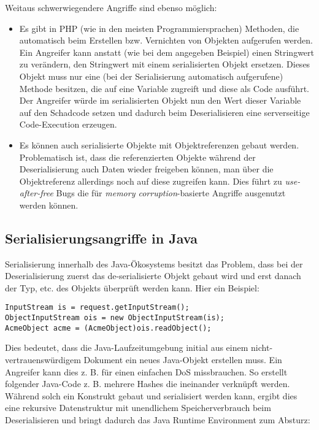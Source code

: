 Weitaus schwerwiegendere Angriffe sind ebenso möglich:

\begin{itemize}
	\item Es gibt in PHP (wie in den meisten Programmiersprachen) Methoden, die automatisch beim Erstellen bzw. Vernichten von Objekten aufgerufen werden. Ein Angreifer kann anstatt (wie bei dem angegeben Beispiel) einen Stringwert zu verändern, den Stringwert mit einem serialisierten Objekt ersetzen. Dieses Objekt muss nur eine (bei der Serialisierung automatisch aufgerufene) Methode besitzen, die auf eine Variable zugreift und diese als Code ausführt. Der Angreifer würde im serialisierten Objekt nun den Wert dieser Variable auf den Schadcode setzen und dadurch beim Deserialisieren eine serverseitige Code-Execution erzeugen.
	\item Es können auch serialisierte Objekte mit Objektreferenzen gebaut werden. Problematisch ist, dass die referenzierten Objekte während der Deserialisierung auch Daten wieder freigeben können, man über die Objektreferenz allerdings noch auf diese zugreifen kann. Dies führt zu \textit{use-after-free} Bugs die für \textit{memory corruption}-basierte Angriffe ausgenutzt werden können.
\end{itemize}

\subsection{Serialisierungsangriffe in Java}

Serialisierung innerhalb des Java-Ökosystems besitzt das Problem, dass bei der Deserialisierung zuerst das de-serialisierte Objekt gebaut wird und erst danach der Typ, etc. des Objekts überprüft werden kann. Hier ein Beispiel:

\begin{verbatim}
InputStream is = request.getInputStream();
ObjectInputStream ois = new ObjectInputStream(is);
AcmeObject acme = (AcmeObject)ois.readObject();
\end{verbatim}

Dies bedeutet, dass die Java-Laufzeitumgebung initial aus einem nicht-vertrauenswürdigem Dokument ein neues Java-Objekt erstellen muss. Ein Angreifer kann dies z. B. für einen einfachen DoS missbrauchen. So erstellt folgender Java-Code z. B. mehrere Hashes die ineinander verknüpft werden. Während solch ein Konstrukt gebaut und serialisiert werden kann, ergibt dies eine rekursive Datenstruktur mit unendlichem Speicherverbrauch beim Deserialisieren und bringt dadurch das Java Runtime Environment zum Absturz:

